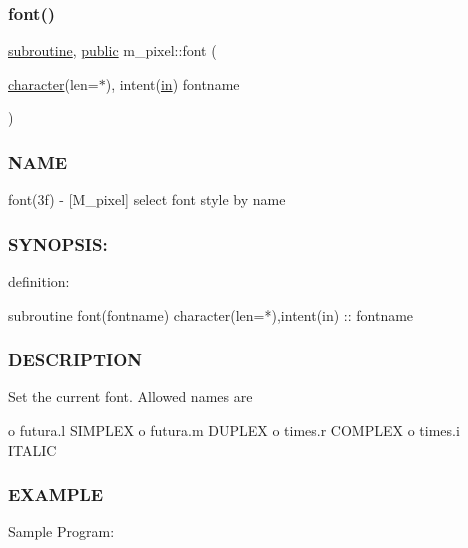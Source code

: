 \subsubsection{\texorpdfstring{font()}{font()}}
{\footnotesize\ttfamily \hyperlink{M__stopwatch_83_8txt_acfbcff50169d691ff02d4a123ed70482}{subroutine}, \hyperlink{M__stopwatch_83_8txt_a2f74811300c361e53b430611a7d1769f}{public} m\+\_\+pixel\+::font (\begin{DoxyParamCaption}\item[{\hyperlink{option__stopwatch_83_8txt_abd4b21fbbd175834027b5224bfe97e66}{character}(len=$\ast$), intent(\hyperlink{M__journal_83_8txt_afce72651d1eed785a2132bee863b2f38}{in})}]{fontname }\end{DoxyParamCaption})}



\subsubsection*{N\+A\+ME}

font(3f) -\/ \mbox{[}M\+\_\+pixel\mbox{]} select font style by name 

\subsubsection*{S\+Y\+N\+O\+P\+S\+IS\+:}

definition\+: \begin{DoxyVerb}   subroutine font(fontname)
   character(len=*),intent(in) :: fontname
\end{DoxyVerb}


\subsubsection*{D\+E\+S\+C\+R\+I\+P\+T\+I\+ON}

Set the current font. Allowed names are

o futura.\+l S\+I\+M\+P\+L\+EX o futura.\+m D\+U\+P\+L\+EX o times.\+r C\+O\+M\+P\+L\+EX o times.\+i I\+T\+A\+L\+IC

\subsubsection*{E\+X\+A\+M\+P\+LE}

Sample Program\+:

